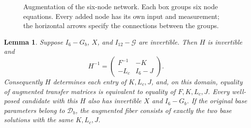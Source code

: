 \documentclass[letterpaper,10pt,conference]{ieeeconf}
\newtheorem{lemma}{Lemma}
\begin{document}
\begin{figure}[t]
\centering
\vspace*{9pt}
\caption{Augmentation of the six-node network. Each box groups six
node equations. Every added node has its own input and measurement;
the horizontal arrows specify the connections between the groups.}
\label{fig:augmentation}
\end{figure}

\begin{lemma}\label{lem:augmentation}
Suppose \(I_6-G_b\), \(X\), and \(I_{12}-\mathcal G\) are invertible.
Then \(H\) is invertible and
\begin{equation}\label{eq:Hinv}
 H^{-1}=\begin{pmatrix}F^{-1}&-K\\-L_c&I_6-J\end{pmatrix}.
\end{equation}
Consequently \(H\) determines each entry of \(K,L_c,J\), and, on this
domain, equality of augmented transfer matrices is equivalent to equality
of \(F,K,L_c,J\).
Every well-posed candidate with this \(H\) also has invertible
\(X\) and \(I_6-G_b\). If the original base parameters belong to
\(\mathcal D_b\), the augmented fiber consists of exactly the two
base solutions with the same \(K,L_c,J\).
\end{lemma}
\end{document}
